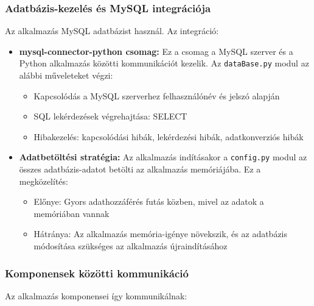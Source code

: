 \documentclass[]{thesis-ekf}
\begin{document}
	\subsubsection{Adatbázis-kezelés és MySQL integrációja}
	
	Az alkalmazás MySQL adatbázist használ. Az integráció:
	
	\begin{itemize}
		\item \textbf{mysql-connector-python csomag:} Ez a csomag a MySQL szerver és a Python alkalmazás közötti kommunikációt kezelik. Az \texttt{dataBase.py} modul az alábbi műveleteket végzi:
		\begin{itemize}
			\item Kapcsolódás a MySQL szerverhez felhasználónév és jelszó alapján
			\item SQL lekérdezések végrehajtása: SELECT
			\item Hibakezelés: kapcsolódási hibák, lekérdezési hibák, adatkonverziós hibák
		\end{itemize}
		
		
		\item \textbf{Adatbetöltési stratégia:} Az alkalmazás indításakor a \texttt{config.py} modul az összes adatbázis-adatot betölti az alkalmazás memóriájába. Ez a megközelítés:
		\begin{itemize}
			\item Előnye: Gyors adathozzáférés futás közben, mivel az adatok a memóriában vannak
			\item Hátránya: Az alkalmazás memória-igénye növekszik, és az adatbázis módosítása szükséges az alkalmazás újraindításához
		\end{itemize}
	\end{itemize}
	
	\subsubsection{Komponensek közötti kommunikáció}
	
	Az alkalmazás komponensei így kommunikálnak:
	
\end{document}
